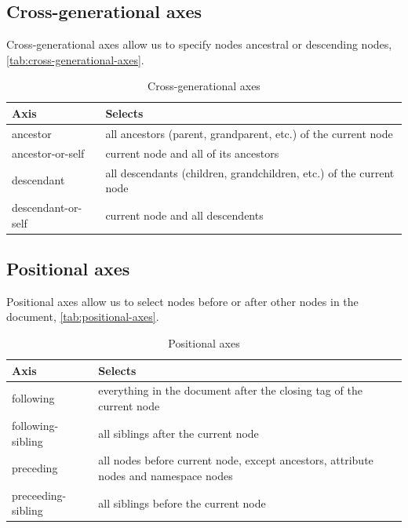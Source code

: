 \documentclass{pgnotes}
\begin{document}
\subsection{Cross-generational axes} 

Cross-generational axes allow us to specify nodes ancestral or descending nodes, \autoref{tab:cross-generational-axes}. 

\begin{table}[htbp]
  \begin{tabularx}{1.0\linewidth}{l X}
    \toprule
    \textbf{Axis} & \textbf{Selects} \\
    \midrule
    ancestor & all ancestors (parent, grandparent, etc.) of the current node \\
    ancestor-or-self & current node and all of its ancestors \\
    descendant & all descendants (children, grandchildren, etc.) of the current node \\
    descendant-or-self & current node and all descendents \\
    \bottomrule
  \end{tabularx}
  \caption{Cross-generational axes}
  \label{tab:cross-generational-axes}
\end{table}




\subsection{Positional axes} 

Positional axes allow us to select nodes before or after other nodes in the document, \autoref{tab:positional-axes}. 

\begin{table}[htbp]
  \begin{tabularx}{1.0\linewidth}{l X}
    \toprule
    \textbf{Axis} & \textbf{Selects} \\
    \midrule
    following & everything in the document after the closing tag of the current node \\
    following-sibling & all siblings after the current node \\
    preceding &  all nodes  before  current node, except ancestors, attribute nodes and namespace nodes \\
    preceeding-sibling & all siblings before the current node \\
    \bottomrule
  \end{tabularx}
  \caption{Positional axes}
  \label{tab:positional-axes}
\end{table}
\end{document}
